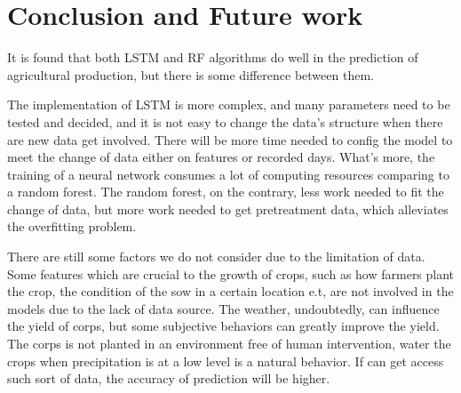 \documentclass[conference]{IEEEtran}
\begin{document}
\section{Conclusion and Future work} \label{sec:con}
It is found that both LSTM and RF algorithms do well in the prediction of agricultural production, but there is some difference between them.

The implementation of LSTM is more complex, and many parameters need to be tested and decided, and it is not easy to change the data's structure when there are new data get involved. There will be more time needed to config the model to meet the change of data either on features or recorded days. What's more, the training of a neural network consumes a lot of computing resources comparing to a random forest. The random forest, on the contrary, less work needed to fit the change of data, but more work needed to get pretreatment data, which alleviates the overfitting problem.

There are still some factors we do not consider due to the limitation of data. Some features which are crucial to the growth of crops, such as how farmers plant the crop, the condition of the sow in a certain location e.t, are not involved in the models due to the lack of data source. The weather, undoubtedly, can influence the yield of corps, but some subjective behaviors can greatly improve the yield. The corps is not planted in an environment free of human intervention, water the crops when precipitation is at a low level is a natural behavior. If can get access such sort of data, the accuracy of prediction will be higher.  



\end{document}
